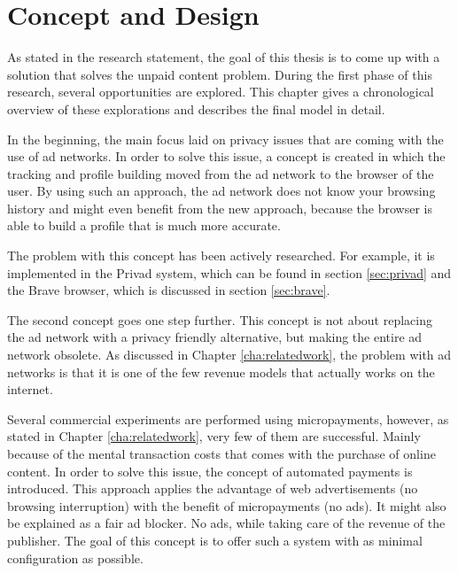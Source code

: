 \chapter{Concept and Design}
\label{cha:conceptanddesign}

As stated in the research statement, the goal of this thesis is to come up with a solution that solves the unpaid content problem. During the first phase of this research, several opportunities are explored. This chapter gives a chronological overview of these explorations and describes the final model in detail.

In the beginning, the main focus laid on privacy issues that are coming with the use of ad networks. In order to solve this issue, a concept is created in which the tracking and profile building moved from the ad network to the browser of the user. By using such an approach, the ad network does not know your browsing history and might even benefit from the new approach, because the browser is able to build a profile that is much more accurate. 

The problem with this concept has been actively researched. For example, it is implemented in the Privad system, which can be found in section \ref{sec:privad} and the Brave browser, which is discussed in section \ref{sec:brave}.

\label{sec:uaps}
The second concept goes one step further. This concept is not about replacing the ad network with a privacy friendly alternative, but making the entire ad network obsolete. As discussed in Chapter \ref{cha:relatedwork}, the problem with ad networks is that it is one of the few revenue models that actually works on the internet.

Several commercial experiments are performed using micropayments, however, as stated in Chapter \ref{cha:relatedwork}, very few of them are successful. Mainly because of the mental transaction costs that comes with the purchase of online content. In order to solve this issue, the concept of automated payments is introduced. This approach applies the advantage of web advertisements (no browsing interruption) with the benefit of micropayments (no ads). It might also be explained as a fair ad blocker. No ads, while taking care of the revenue of the publisher. The goal of this concept is to offer such a system with as minimal configuration as possible.

\newpage

